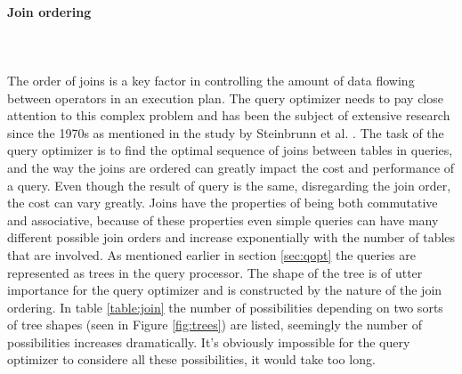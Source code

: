 \documentclass{cslthse-msc}
\begin{document}
\paragraph*{Join ordering}\mbox{}\\\\
The order of joins is a key factor in controlling the amount of data flowing between operators in an execution plan. The query optimizer needs to pay close attention to this complex problem and has been the subject of extensive research since the 1970s  as mentioned in the study by Steinbrunn et al. \cite{join}. The task of the query optimizer is to find the optimal sequence of joins between tables in queries, and the way the joins are ordered can greatly impact the cost and performance of a query. Even though the result of query is the same, disregarding the join order, the cost can vary greatly. Joins have the properties of being both commutative and associative, because of these properties even simple queries can have many different possible join orders and increase exponentially with the number of tables that are involved. As mentioned earlier in section \ref{sec:qopt} the queries are represented as trees in the query processor. The shape of the tree is of utter importance for the query optimizer and is constructed by the nature of the join ordering. In table \ref{table:join} the number of possibilities depending on two sorts of tree shapes (seen in Figure \ref{fig:trees}) are listed, seemingly the number of possibilities increases dramatically. It's obviously impossible for the query optimizer to considere all these possibilities, it would take too long.  
\end{document}
